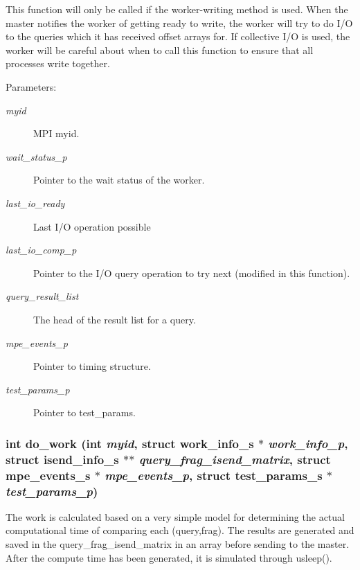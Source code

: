 This function will only be called if the worker-writing method is used. When the master notifies the worker of getting ready to write, the worker will try to do I/O to the queries which it has received offset arrays for. If collective I/O is used, the worker will be careful about when to call this function to ensure that all processes write together.

\begin{Desc}
\item[Parameters:]
\begin{description}
\item[{\em myid}]MPI myid. \item[{\em wait\_\-status\_\-p}]Pointer to the wait status of the worker. \item[{\em last\_\-io\_\-ready}]Last I/O operation possible \item[{\em last\_\-io\_\-comp\_\-p}]Pointer to the I/O query operation to try next (modified in this function). \item[{\em query\_\-result\_\-list}]The head of the result list for a query. \item[{\em mpe\_\-events\_\-p}]Pointer to timing structure. \item[{\em test\_\-params\_\-p}]Pointer to test\_\-params. \end{description}
\end{Desc}
\subsubsection{\setlength{\rightskip}{0pt plus 5cm}int do\_\-work (int {\em myid}, struct \bf{work\_\-info\_\-s} $\ast$ {\em work\_\-info\_\-p}, struct \bf{isend\_\-info\_\-s} $\ast$$\ast$ {\em query\_\-frag\_\-isend\_\-matrix}, struct \bf{mpe\_\-events\_\-s} $\ast$ {\em mpe\_\-events\_\-p}, struct \bf{test\_\-params\_\-s} $\ast$ {\em test\_\-params\_\-p})}\label{worker__help_8h_e2fcc507d8e2594dc36e1ab4691682c8}


The work is calculated based on a very simple model for determining the actual computational time of comparing each (query,frag). The results are generated and saved in the query\_\-frag\_\-isend\_\-matrix in an array before sending to the master. After the compute time has been generated, it is simulated through usleep().

